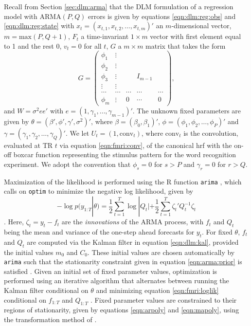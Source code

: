 Recall from Section \ref{sec:dlm:arma} that the DLM formulation of a regression model with $\mbox{ARMA}(P,Q)$ errors is given by equations \eqref{eqn:dlm:reg:obs} and \eqref{eqn:dlm:reg:state} with $x_t = (x_{t,1} ,x_{t,2}, \ldots, x_{t,m})'$ an $m$-dimensional vector, $m = \mbox{max}(P,Q+1)$, $F_t$ a time-invariant $1 \times m$ vector with first element equal to 1 and the rest 0, $v_t = 0$ for all $t$, $G$ a $m \times m$ matrix that takes the form
\[
G = \left(
 \begin{array}{ccccc}
 \phi_1 & \vdots \\
 \phi_2 & \vdots \\
 \phi_3 & \vdots && I_{m-1} \\
 \vdots & \vdots \\
 \cdots & \cdots & \cdots & \cdots & \cdots \\
 \phi_m &\vdots & 0 & \cdots & 0
 \end{array}
\right),
\]
and $W = \sigma^2ee'$ with $e = (1, \gamma_1, \ldots, \gamma_{m-1})'$. The unknown fixed parameters are given by $\theta = (\beta', \phi', \gamma', \sigma^2)'$, where $\beta = (\beta_0,\beta_1)'$, $\phi = (\phi_1,\phi_2,\ldots,\phi_P)'$ and $\gamma = (\gamma_1,\gamma_2,\ldots,\gamma_Q)'$. We let $U_t = (1,\mbox{conv}_t)$, where $\mbox{conv}_t$ is the convolution, evaluated at TR $t$ via equation \eqref{eqn:fmri:conv}, of the canonical hrf with the on-off boxcar function representing the stimulus pattern for the word recognition experiment. We adopt the convention that $\phi_s = 0$ for $s > P$ and $\gamma_r = 0$ for $r > Q$.

Maximization of the likelihood is performed using the R function {\tt arima} \citep{Rstats}, which calls on {\tt optim} to minimize the negative log likelihood, given by
\begin{equation}
-\log p(y_{1:T}|\theta) = \frac{1}{2}\sum_{t=1}^T \log|Q_t| + \frac{1}{2}\sum_{t=1}^T \zeta_t' Q_t^{-1} \zeta_t \label{eqn:fmri:loglik}
\end{equation}
\citep[Chapter 6]{shum:stof:2006:timeseries}. Here, $\zeta_t = y_t - f_t$ are the \emph{innovations} of the ARMA process, with $f_t$ and $Q_t$ being the mean and variance of the one-step ahead forecasts for $y_t$. For fixed $\theta$, $f_t$ and $Q_t$ are computed via the Kalman filter in equation \eqref{eqn:dlm:kal}, provided the initial values $m_0$ and $C_0$. These initial values are chosen automatically by {\tt arima} such that the stationarity constraint given in equation \eqref{eqn:arma:prior} is satisfied \citep{gardner:harvey:mlearma:1980}. Given an initial set of fixed parameter values, optimization is performed using an iterative algorithm that alternates between running the Kalman filter conditional on $\theta$ and minimizing equation \eqref{eqn:fmri:loglik} conditional on $f_{1:T}$ and $Q_{1:T}$ \citep{durbin:koopman:timeseries:2012}. Fixed parameter values are constrained to their regions of stationarity, given by equations \eqref{eqn:arpoly} and \eqref{eqn:mapoly}, using the transformation method of \citet{jones:arma:1980}.

